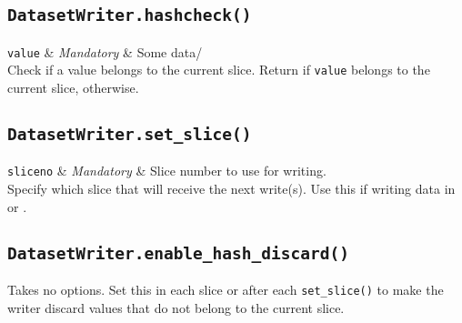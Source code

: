 \subsection{\texttt{DatasetWriter.hashcheck()}}
\starttable
\texttt{value} & \textsl{Mandatory} & Some data/\\
\stoptable
Check if a value belongs to the current slice.
Return \pyTrue if \texttt{value} belongs to the current
slice, \pyFalse otherwise.


\subsection{\texttt{DatasetWriter.set\_slice()}}
\starttable
\texttt{sliceno} & \textsl{Mandatory} & Slice number to use for writing.\\
\stoptable
Specify which slice that will receive the next write(s).  Use this if
writing data in \prepare or \synthesis.


\subsection{\texttt{DatasetWriter.enable\_hash\_discard()}}
Takes no options.  Set this in each slice or after
each \texttt{set\_slice()} to make the writer discard values that do
not belong to the current slice.



\clearpage
